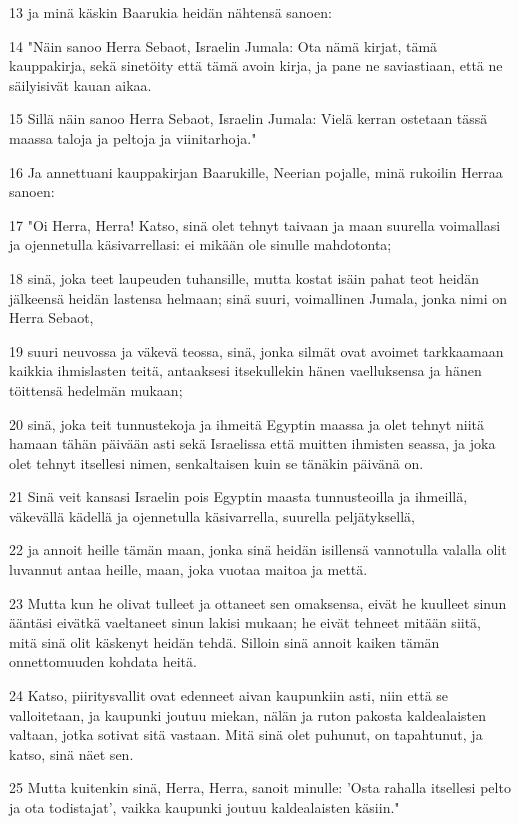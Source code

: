 \par 13 ja minä käskin Baarukia heidän nähtensä sanoen:
\par 14 "Näin sanoo Herra Sebaot, Israelin Jumala: Ota nämä kirjat, tämä kauppakirja, sekä sinetöity että tämä avoin kirja, ja pane ne saviastiaan, että ne säilyisivät kauan aikaa.
\par 15 Sillä näin sanoo Herra Sebaot, Israelin Jumala: Vielä kerran ostetaan tässä maassa taloja ja peltoja ja viinitarhoja."
\par 16 Ja annettuani kauppakirjan Baarukille, Neerian pojalle, minä rukoilin Herraa sanoen:
\par 17 "Oi Herra, Herra! Katso, sinä olet tehnyt taivaan ja maan suurella voimallasi ja ojennetulla käsivarrellasi: ei mikään ole sinulle mahdotonta;
\par 18 sinä, joka teet laupeuden tuhansille, mutta kostat isäin pahat teot heidän jälkeensä heidän lastensa helmaan; sinä suuri, voimallinen Jumala, jonka nimi on Herra Sebaot,
\par 19 suuri neuvossa ja väkevä teossa, sinä, jonka silmät ovat avoimet tarkkaamaan kaikkia ihmislasten teitä, antaaksesi itsekullekin hänen vaelluksensa ja hänen töittensä hedelmän mukaan;
\par 20 sinä, joka teit tunnustekoja ja ihmeitä Egyptin maassa ja olet tehnyt niitä hamaan tähän päivään asti sekä Israelissa että muitten ihmisten seassa, ja joka olet tehnyt itsellesi nimen, senkaltaisen kuin se tänäkin päivänä on.
\par 21 Sinä veit kansasi Israelin pois Egyptin maasta tunnusteoilla ja ihmeillä, väkevällä kädellä ja ojennetulla käsivarrella, suurella peljätyksellä,
\par 22 ja annoit heille tämän maan, jonka sinä heidän isillensä vannotulla valalla olit luvannut antaa heille, maan, joka vuotaa maitoa ja mettä.
\par 23 Mutta kun he olivat tulleet ja ottaneet sen omaksensa, eivät he kuulleet sinun ääntäsi eivätkä vaeltaneet sinun lakisi mukaan; he eivät tehneet mitään siitä, mitä sinä olit käskenyt heidän tehdä. Silloin sinä annoit kaiken tämän onnettomuuden kohdata heitä.
\par 24 Katso, piiritysvallit ovat edenneet aivan kaupunkiin asti, niin että se valloitetaan, ja kaupunki joutuu miekan, nälän ja ruton pakosta kaldealaisten valtaan, jotka sotivat sitä vastaan. Mitä sinä olet puhunut, on tapahtunut, ja katso, sinä näet sen.
\par 25 Mutta kuitenkin sinä, Herra, Herra, sanoit minulle: 'Osta rahalla itsellesi pelto ja ota todistajat', vaikka kaupunki joutuu kaldealaisten käsiin."
